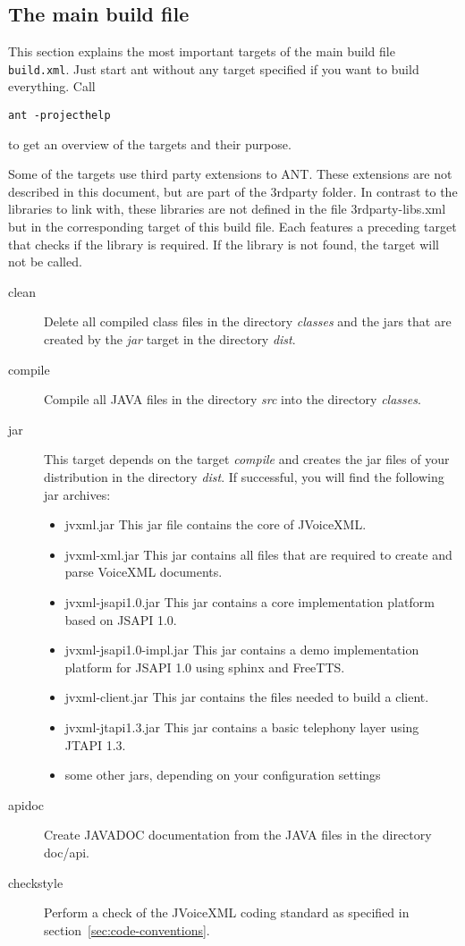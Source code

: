 \documentclass[11pt,a4paper]{article}
\begin{document}
\subsection{The main build file}

This section explains the most important targets of the main build file
\texttt{build.xml}. Just start ant without any target specified if you want to
build everything. Call 
\begin{lstlisting}
ant -projecthelp
\end{lstlisting}
to get an overview of the targets and their purpose.

Some of the targets use third party extensions to ANT. These 
extensions are not described in this document, but are part of
the 3rdparty folder. In contrast to the libraries to link with,
these libraries are not defined in the file 3rdparty-libs.xml
but in the corresponding target of this build file. Each features
a preceding target that checks if the library is required. If
the library is not found, the target will not be called.

\begin{description}
\item[clean]
Delete all compiled class files in the directory \emph{classes}
and the jars that are created by the \emph{jar} target in the directory 
\emph{dist}.

\item[compile]
 Compile all JAVA files in the directory \emph{src} into the directory
\emph{classes}.

\item[jar]
 This target depends on the target \emph{compile} and creates the jar
files of your distribution in the directory \emph{dist}.
If successful, you will find the following jar archives:
\begin{itemize}
\item jvxml.jar This jar file contains the core of JVoiceXML.
\item jvxml-xml.jar This jar contains all files that are required
to create and parse VoiceXML documents.
\item jvxml-jsapi1.0.jar This jar contains a core implementation platform
based on JSAPI 1.0.
\item jvxml-jsapi1.0-impl.jar This jar contains a demo implementation
platform for JSAPI 1.0 using sphinx and FreeTTS.
\item jvxml-client.jar This jar contains the files needed to build
a client.
\item jvxml-jtapi1.3.jar This jar contains a basic telephony layer using
JTAPI 1.3.
\item some other jars, depending on your configuration settings
\end{itemize}

\item[apidoc]
Create JAVADOC documentation from the JAVA files in the directory
doc/api.
\item[checkstyle]
Perform a check of the JVoiceXML coding standard as specified 
in section~\ref{sec:code-conventions}.
\end{description}
\end{document}
